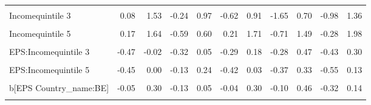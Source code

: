 \begin{table}
\begin{tabular}[t]{lrrrrrrrrrr}
\cellcolor{gray!10}{Incomequintile 2} & \cellcolor{gray!10}{-0.70} & \cellcolor{gray!10}{0.83} & \cellcolor{gray!10}{-0.68} & \cellcolor{gray!10}{0.50} & \cellcolor{gray!10}{-0.47} & \cellcolor{gray!10}{1.14} & \cellcolor{gray!10}{-1.69} & \cellcolor{gray!10}{0.71} & \cellcolor{gray!10}{-1.29} & \cellcolor{gray!10}{1.19}\\
Incomequintile 3 & 0.08 & 1.53 & -0.24 & 0.97 & -0.62 & 0.91 & -1.65 & 0.70 & -0.98 & 1.36\\
\cellcolor{gray!10}{Incomequintile 4} & \cellcolor{gray!10}{0.19} & \cellcolor{gray!10}{1.65} & \cellcolor{gray!10}{-0.10} & \cellcolor{gray!10}{1.14} & \cellcolor{gray!10}{-0.37} & \cellcolor{gray!10}{1.12} & \cellcolor{gray!10}{-1.54} & \cellcolor{gray!10}{0.82} & \cellcolor{gray!10}{-1.25} & \cellcolor{gray!10}{1.12}\\
Incomequintile 5 & 0.17 & 1.64 & -0.59 & 0.60 & 0.21 & 1.71 & -0.71 & 1.49 & -0.28 & 1.98\\
\cellcolor{gray!10}{EPS:Incomequintile 2} & \cellcolor{gray!10}{-0.25} & \cellcolor{gray!10}{0.20} & \cellcolor{gray!10}{-0.15} & \cellcolor{gray!10}{0.21} & \cellcolor{gray!10}{-0.36} & \cellcolor{gray!10}{0.13} & \cellcolor{gray!10}{-0.25} & \cellcolor{gray!10}{0.50} & \cellcolor{gray!10}{-0.36} & \cellcolor{gray!10}{0.40}\\
EPS:Incomequintile 3 & -0.47 & -0.02 & -0.32 & 0.05 & -0.29 & 0.18 & -0.28 & 0.47 & -0.43 & 0.30\\
\cellcolor{gray!10}{EPS:Incomequintile 4} & \cellcolor{gray!10}{-0.47} & \cellcolor{gray!10}{-0.02} & \cellcolor{gray!10}{-0.30} & \cellcolor{gray!10}{0.08} & \cellcolor{gray!10}{-0.28} & \cellcolor{gray!10}{0.18} & \cellcolor{gray!10}{-0.16} & \cellcolor{gray!10}{0.56} & \cellcolor{gray!10}{-0.33} & \cellcolor{gray!10}{0.40}\\
EPS:Incomequintile 5 & -0.45 & 0.00 & -0.13 & 0.24 & -0.42 & 0.03 & -0.37 & 0.33 & -0.55 & 0.13\\
\cellcolor{gray!10}{b[(Intercept) Country\_name:BE]} & \cellcolor{gray!10}{-0.25} & \cellcolor{gray!10}{0.72} & \cellcolor{gray!10}{-0.28} & \cellcolor{gray!10}{0.19} & \cellcolor{gray!10}{-0.26} & \cellcolor{gray!10}{0.63} & \cellcolor{gray!10}{-0.52} & \cellcolor{gray!10}{0.98} & \cellcolor{gray!10}{-0.75} & \cellcolor{gray!10}{0.42}\\
b[EPS Country\_name:BE] & -0.05 & 0.30 & -0.13 & 0.05 & -0.04 & 0.30 & -0.10 & 0.46 & -0.32 & 0.14\\
\cellcolor{gray!10}{b[(Intercept) Country\_name:CA]} & \cellcolor{gray!10}{-0.49} & \cellcolor{gray!10}{0.31} & \cellcolor{gray!10}{-0.22} & \cellcolor{gray!10}{0.23} & \cellcolor{gray!10}{-0.48} & \cellcolor{gray!10}{0.30} & \cellcolor{gray!10}{-1.01} & \cellcolor{gray!10}{0.54} & \cellcolor{gray!10}{-0.56} & \cellcolor{gray!10}{0.52}\\

\end{tabular}
\end{table}
